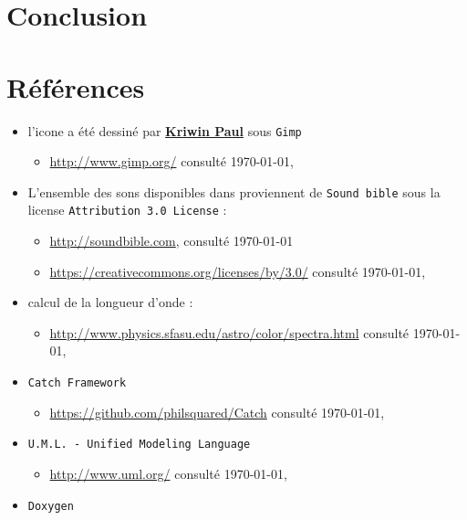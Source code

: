 \documentclass[a4paper,11pt]{report}
\begin{document}
\chapter{Conclusion}


\appendix


\chapter{Références}\label{ref}

\begin{itemize}
	\item[] l'icone a été dessiné par \href{mailto:39171@heb.be}{\textbf{Kriwin Paul}} sous
		\texttt{Gimp}
		\begin{itemize}
			\item \url{http://www.gimp.org/} consulté \today, \\
		\end{itemize}
	\item[] L'ensemble des sons disponibles dans 
		proviennent de \texttt{Sound bible}  sous la license 
		\texttt{Attribution 3.0 License} :
		\begin{itemize}
			\item \url{http://soundbible.com}, consulté \today
			\item \url{https://creativecommons.org/licenses/by/3.0/} consulté
				\today,\\
		\end{itemize}
	\item[] calcul de la longueur d'onde :
		\begin{itemize}
			\item \url{http://www.physics.sfasu.edu/astro/color/spectra.html}
				consulté \today, \\
		\end{itemize}
	\item[] \texttt{Catch Framework} 
		\begin{itemize}
			\item \url{https://github.com/philsquared/Catch} consulté \today,\\
		\end{itemize}
	\item[] \texttt{U.M.L. - Unified Modeling Language} 
		\begin{itemize}
			\item \url{http://www.uml.org/} consulté \today,\\
		\end{itemize}
	\item[] \texttt{Doxygen} 

\end{itemize}
\end{document}
